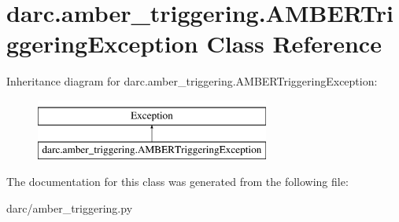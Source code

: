 \hypertarget{classdarc_1_1amber__triggering_1_1_a_m_b_e_r_triggering_exception}{}\section{darc.\+amber\+\_\+triggering.\+A\+M\+B\+E\+R\+Triggering\+Exception Class Reference}
\label{classdarc_1_1amber__triggering_1_1_a_m_b_e_r_triggering_exception}
Inheritance diagram for darc.\+amber\+\_\+triggering.\+A\+M\+B\+E\+R\+Triggering\+Exception\+:\begin{figure}[H]
\begin{center}
\leavevmode
\includegraphics[height=2.000000cm]{classdarc_1_1amber__triggering_1_1_a_m_b_e_r_triggering_exception}
\end{center}
\end{figure}


The documentation for this class was generated from the following file\+:\begin{DoxyCompactItemize}
\item 
darc/amber\+\_\+triggering.\+py\end{DoxyCompactItemize}
